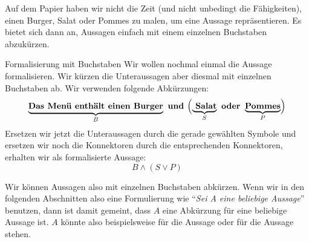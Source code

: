 \documentclass[../../main.tex]{subfiles}
\begin{document}
Auf dem Papier haben wir nicht die Zeit (und nicht unbedingt die Fähigkeiten), einen Burger, Salat oder Pommes zu malen, um eine Aussage repräsentieren. Es bietet sich dann an, Aussagen einfach mit einem einzelnen Buchstaben abzukürzen. 
 
 \begin{example}{Formalisierung mit Buchstaben}
 Wir wollen nochmal einmal die Aussage  formalisieren. Wir kürzen die Unteraussagen aber diesmal mit einzelnen Buchstaben ab. Wir verwenden folgende Abkürzungen:
     \[\underbrace{\textbf{Das Menü enthält einen Burger}}_{B}\textbf{~und~}\Bigl(\underbrace{\textbf{ Salat}}_{S}\textbf{~oder~}\underbrace{\textbf{Pommes}}_{P}\Bigr)\]
Ersetzen wir jetzt die Unteraussagen durch die gerade gewählten Symbole und ersetzen wir noch die Konnektoren durch die entsprechenden Konnektoren, erhalten wir als formalisierte Aussage:
    \[B \land (S \lor P)\]
 \end{example}

 Wir können Aussagen also mit einzelnen Buchstaben abkürzen. Wenn wir in den folgenden 
 Abschnitten also eine Formulierung wie \enquote{\textit{Sei A eine beliebige Aussage}} benutzen, dann
ist damit gemeint, dass $A$ eine Abkürzung für eine beliebige Aussage ist. $A$ könnte also 
beispielsweise für die Aussage  oder für die Aussage
 stehen.
\end{document}
